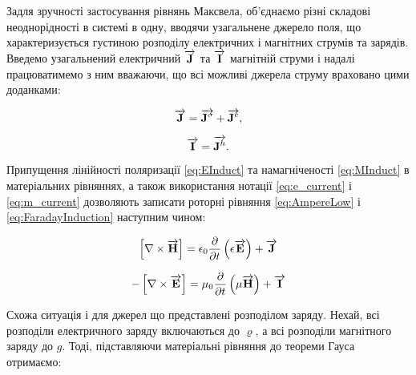 Задля зручності застосування рівнянь Максвела, об'єднаємо різні складові 
неоднорідності в системі в одну, вводячи узагальнене джерело поля, що 
характеризується густиною розподілу електричних і магнітних струмів та 
зарядів. Введемо узагальнений електричний $ \overrightarrow{\mathbf J} $ та $ \overrightarrow{\mathbf I} $ магнітній 
струми і надалі працюватимемо з ним вважаючи, що всі можливі джерела струму 
враховано цими доданками:

\begin{equation} \label{eq:e_current}
\overrightarrow{\mathbf J} = \overrightarrow{\mathbf J^\sigma} + \overrightarrow{\mathbf J^e},
\end{equation}

\begin{equation} \label{eq:m_current}
\overrightarrow{\mathbf I} = \overrightarrow{\mathbf J^h}.
\end{equation}

Припущення лінійності поляризації \eqref{eq:EInduct} та намагніченості 
\eqref{eq:MInduct} в матеріальних рівняннях, а також використання нотації
\eqref{eq:e_current} і \eqref{eq:m_current} дозволяють записати роторні 
рівняння \eqref{eq:AmpereLow} і \eqref{eq:FaradayInduction} наступним чином:

%
\begin{equation} \label{eq:rotHfromE}
\left[ \nabla \times \overrightarrow{\mathbf H} \right] = 
\epsilon_0 \frac{\partial }{\partial t} \left( \epsilon \overrightarrow{\mathbf E} \right) + \overrightarrow{\mathbf J}
\end{equation}

\begin{equation} \label{eq:rotEfromH} 
- \left[ \nabla \times \overrightarrow{\mathbf E} \right] = 
\mu_0 \frac{\partial }{\partial t} \left( \mu \overrightarrow{\mathbf H} \right) + \overrightarrow{\mathbf I}
\end{equation}

Схожа ситуація і для джерел що представлені розподілом заряду. Нехай,
всі розподіли електричного заряду включаються до $ \varrho $, а всі розподіли 
магнітного заряду до $ g $. Тоді, підставляючи матеріальні рівняння до теореми 
Гауса отримаємо:

